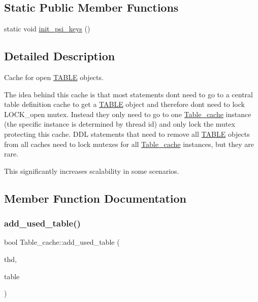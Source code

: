 \subsection*{Static Public Member Functions}
\begin{DoxyCompactItemize}
\item 
static void \mbox{\hyperlink{classTable__cache_ab87a81918be08e180793e64050a94564}{init\+\_\+psi\+\_\+keys}} ()
\end{DoxyCompactItemize}


\subsection{Detailed Description}
Cache for open \mbox{\hyperlink{structTABLE}{T\+A\+B\+LE}} objects.

The idea behind this cache is that most statements don\textquotesingle{}t need to go to a central table definition cache to get a \mbox{\hyperlink{structTABLE}{T\+A\+B\+LE}} object and therefore don\textquotesingle{}t need to lock L\+O\+C\+K\+\_\+open mutex. Instead they only need to go to one \mbox{\hyperlink{classTable__cache}{Table\+\_\+cache}} instance (the specific instance is determined by thread id) and only lock the mutex protecting this cache. D\+DL statements that need to remove all \mbox{\hyperlink{structTABLE}{T\+A\+B\+LE}} objects from all caches need to lock mutexes for all \mbox{\hyperlink{classTable__cache}{Table\+\_\+cache}} instances, but they are rare.

This significantly increases scalability in some scenarios. 

\subsection{Member Function Documentation}
\mbox{\label{classTable__cache_a0a74ea3cbfcab0314e4ef160979a2962}} 
\subsubsection{\texorpdfstring{add\+\_\+used\+\_\+table()}{add\_used\_table()}}
{\footnotesize\ttfamily bool Table\+\_\+cache\+::add\+\_\+used\+\_\+table (\begin{DoxyParamCaption}\item[{T\+HD $\ast$}]{thd,  }\item[{\mbox{\hyperlink{structTABLE}{T\+A\+B\+LE}} $\ast$}]{table }\end{DoxyParamCaption})\hspace{0.3cm}{\ttfamily [inline]}}

